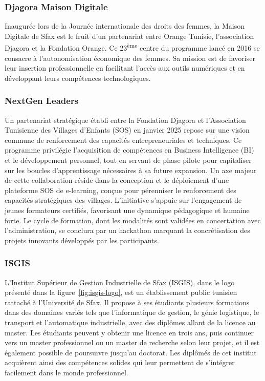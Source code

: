 \subsubsection{Djagora Maison Digitale}

Inaugurée lors de la Journée internationale des droits des femmes, la Maison Digitale de Sfax est le fruit d'un partenariat entre Orange Tunisie, l'association Djagora et la Fondation Orange. Ce 23\textsuperscript{ème} centre du programme lancé en 2016 se consacre à l'autonomisation économique des femmes. Sa mission est de favoriser leur insertion professionnelle en facilitant l'accès aux outils numériques et en développant leurs compétences technologiques.


\subsubsection{NextGen Leaders}

Un partenariat stratégique établi entre la Fondation Djagora et l'Association Tunisienne des Villages d'Enfants (SOS) en janvier 2025 repose sur une vision commune de renforcement des capacités entrepreneuriales et techniques. Ce programme privilégie l'acquisition de compétences en Business Intelligence (BI) et le développement personnel, tout en servant de phase pilote pour capitaliser sur les boucles d'apprentissage nécessaires à sa future expansion. Un axe majeur de cette collaboration réside dans la conception et le déploiement d'une plateforme SOS de e-learning, conçue pour pérenniser le renforcement des capacités stratégiques des villages. L'initiative s'appuie sur l'engagement de jeunes formateurs certifiés, favorisant une dynamique pédagogique et humaine forte. Le cycle de formation, dont les modalités sont validées en concertation avec l'administration, se conclura par un hackathon marquant la concrétisation des projets innovants développés par les participants.


\subsubsection{ISGIS}

L’Institut Supérieur de Gestion Industrielle de Sfax (ISGIS), dans le logo présenté dans la figure~\ref{fig:isgis-logo}, est un établissement public tunisien rattaché à l’Université de Sfax. Il propose à ses étudiants plusieurs formations dans des domaines variés tels que l’informatique de gestion, le génie logistique, le transport et l’automatique industrielle, avec des diplômes allant de la licence au master. Les étudiants peuvent y obtenir une licence en trois ans, puis continuer vers un master professionnel ou un master de recherche selon leur projet, et il est également possible de poursuivre jusqu’au doctorat. Les diplômés de cet institut acquièrent ainsi des compétences solides qui leur permettent de s’intégrer facilement dans le monde professionnel.

